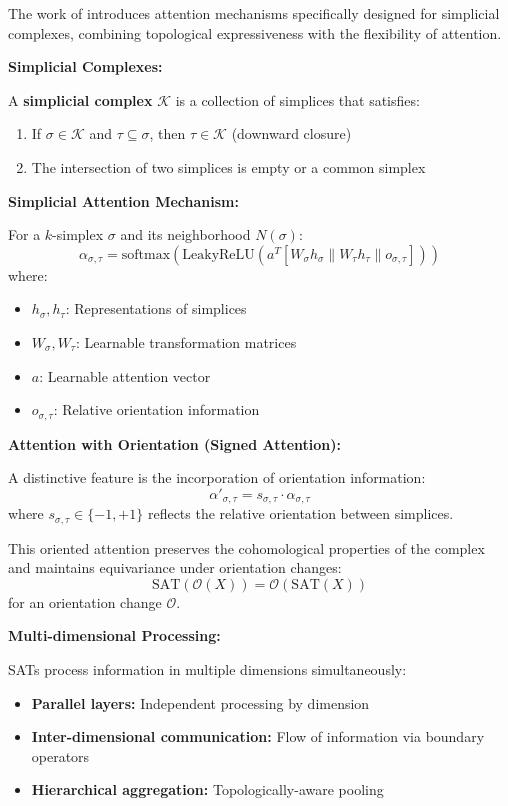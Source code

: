 The work of \citet{giusti2022simplicial} introduces attention mechanisms specifically designed for simplicial complexes, combining topological expressiveness with the flexibility of attention.

\textbf{Simplicial Complexes:}

\begin{definition}
A \textbf{simplicial complex} $\mathcal{K}$ is a collection of simplices that satisfies:
\begin{enumerate}
    \item If $\sigma \in \mathcal{K}$ and $\tau \subseteq \sigma$, then $\tau \in \mathcal{K}$ (downward closure)
    \item The intersection of two simplices is empty or a common simplex
\end{enumerate}
\end{definition}

\textbf{Simplicial Attention Mechanism:}

For a $k$-simplex $\sigma$ and its neighborhood $N(\sigma)$:
\[\alpha_{\sigma,\tau} = \text{softmax}\left(\text{LeakyReLU}\left(a^T[W_\sigma h_\sigma \| W_\tau h_\tau \| o_{\sigma,\tau}]\right)\right)\]
where:
\begin{itemize}
    \item $h_\sigma, h_\tau$: Representations of simplices
    \item $W_\sigma, W_\tau$: Learnable transformation matrices
    \item $a$: Learnable attention vector
    \item $o_{\sigma,\tau}$: Relative orientation information
\end{itemize}

\textbf{Attention with Orientation (Signed Attention):}

A distinctive feature is the incorporation of orientation information:
\[\alpha'_{\sigma,\tau} = s_{\sigma,\tau} \cdot \alpha_{\sigma,\tau}\]
where $s_{\sigma,\tau} \in \{-1, +1\}$ reflects the relative orientation between simplices.

This oriented attention preserves the cohomological properties of the complex and maintains equivariance under orientation changes:
\[\text{SAT}(\mathcal{O}(X)) = \mathcal{O}(\text{SAT}(X))\]
for an orientation change $\mathcal{O}$.

\textbf{Multi-dimensional Processing:}

SATs process information in multiple dimensions simultaneously:
\begin{itemize}
    \item \textbf{Parallel layers:} Independent processing by dimension
    \item \textbf{Inter-dimensional communication:} Flow of information via boundary operators
    \item \textbf{Hierarchical aggregation:} Topologically-aware pooling
\end{itemize}

